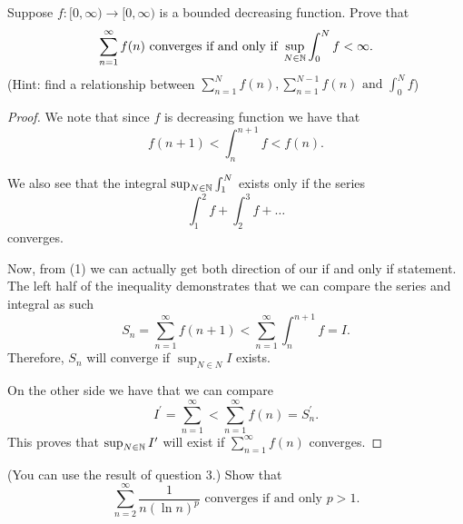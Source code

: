 \documentclass[twoside]{article}
\begin{document}
    \newpage
    Suppose $f : [0, \infty) \to [0, \infty)$ is a bounded decreasing function.
    Prove that 
    \begin{equation*}
        \sum_{n=1}^{\infty}f(n) \text{ converges if and only if } \sup_{N \in \mathbb{N}} \int_{0}^{N} f < \infty.
    \end{equation*}
    (Hint: find a relationship between $\sum_{n=1}^{N} f(n), \sum_{n=1}^{N-1} f(n) \text{ and } \int_{0}^{N}f $)

    \begin{proof}
        We note that since $f$ is decreasing function we have that 
        \begin{equation}
            f(n + 1) < \int_{n}^{n+1} f < f(n).
        \end{equation}
        
        We also see that the integral $\sup_{N \in \mathbb{N}}\int_{1}^{N}$ exists only if the series
        \begin{equation*}
            \int_{1}^{2} f + \int_{2}^{3} f + \dots
        \end{equation*}
        converges.

        Now, from (1) we can actually get both direction of our if and only if statement.
        The left half of the inequality demonstrates that we can compare the series and integral
        as such 
        \begin{equation*}
            S_{n} = \sum_{n = 1}^{\infty} f(n + 1) < \sum_{n = 1}^{\infty} \int_{n}^{n+1} f = I.
        \end{equation*}
        Therefore, $S_{n}$ will converge if $\sup_{N \in N} I$ exists.

        On the other side we have that we can compare
        \begin{equation*}
            I^{\prime} = \sum_{n = 1}^{\infty} < \sum_{n=1}^{\infty} f(n) = S_{n}^{\prime}.
        \end{equation*}
        This proves that $\sup_{N \in \mathbb{N}}I^{\prime}$ will exist if $\sum_{n=1}^{\infty}f(n)$ converges.

    \end{proof}

    \newpage
    (You can use the result of question 3.) Show that 
    \begin{equation*}
        \sum_{n=2}^{\infty} \frac{1}{n(\ln n)^{p}} \text{ converges if and only } p > 1.
    \end{equation*}
\end{document}
